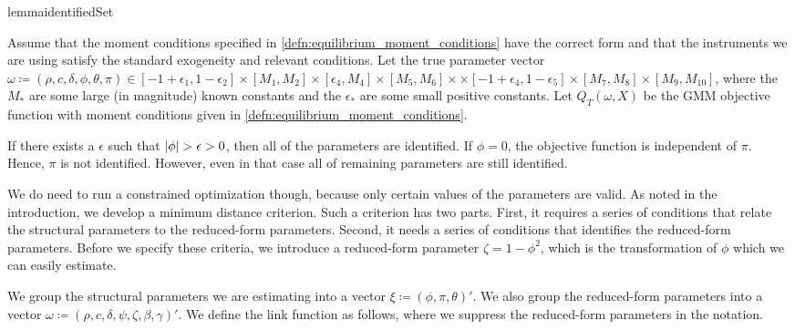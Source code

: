 \documentclass[11pt, letterpaper, twoside]{article}
\begin{document}
\begin{restatable}{lemma}{identifiedSet}

    Assume that the moment conditions specified in \cref{defn:equilibrium_moment_conditions} have the correct form and that the instruments we are using satisfy the standard exogeneity and relevant conditions. Let the true parameter vector $\omega \coloneqq (\rho, c, \delta, \phi, \theta, \pi) \in [-1+\epsilon_1, 1 - \epsilon_2] \times [M_1, M_2] \times [\epsilon_4, M_4]\times [M_5, M_6]\times \times [-1 + \epsilon_4, 1 - \epsilon_5] \times [M_7, M_8] \times [M_{9}, M_{10}]$, where the $M_{\ast}$ are some large (in magnitude) known constants and the $\epsilon_{\ast}$ are some small positive constants. Let $Q_T(\omega, X)$ be the GMM objective function with moment conditions given in \cref{defn:equilibrium_moment_conditions}.  
 
    If there exists a $\epsilon$ such that $\lvert\phi\rvert > \epsilon > 0$, then all of the parameters are identified.  If $\phi = 0$, the objective function is independent of $\pi$.  Hence, $\pi$ is not identified. However, even in that case all of remaining parameters are still identified.

\end{restatable}

We do need to run a constrained optimization though, because only certain values of the parameters are valid. As noted in the introduction, we develop a minimum distance criterion. Such a criterion has two parts. First, it requires a series of conditions that relate the structural parameters to the reduced-form parameters.  Second, it needs a series of conditions that identifies the reduced-form parameters. Before we specify these criteria, we introduce a reduced-form parameter $\zeta = 1 - \phi^2$, which is the transformation of $\phi$ which we can easily estimate.

We group the structural parameters we are estimating into a vector $\xi \coloneqq (\phi, \pi, \theta)'$.
We also group the reduced-form parameters into a vector $\omega \coloneqq (\rho, c, \delta, \psi, \zeta, \beta, \gamma)'$.
We define the link function as follows, where we suppress the reduced-form parameters in the notation.
\end{document}
